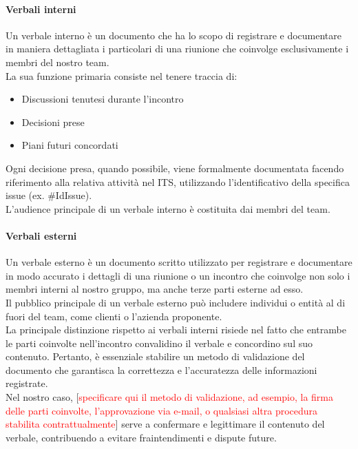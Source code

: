 \documentclass{article}
\begin{document}
\paragraph{Verbali interni}\label{sec:verbali interni}
Un verbale interno è un documento che ha lo scopo di registrare e documentare in maniera dettagliata i particolari di una riunione che coinvolge esclusivamente i membri del nostro team.\\
La sua funzione primaria consiste nel tenere traccia di:
\begin{itemize}
    \item Discussioni tenutesi durante l'incontro
    \item Decisioni prese
    \item Piani futuri concordati 
\end{itemize}
Ogni decisione presa, quando possibile, viene formalmente documentata facendo riferimento alla relativa attività nel ITS, utilizzando l'identificativo della specifica issue (ex. \#IdIssue).\\
L'audience principale di un verbale interno è costituita dai membri del team.

\paragraph{Verbali esterni}\label{sec:verbali esterni}

Un verbale esterno è un documento scritto utilizzato per registrare e documentare in modo accurato i dettagli di una riunione o un incontro che coinvolge non solo i membri interni al nostro gruppo, ma anche terze parti esterne ad esso.\\
Il pubblico principale di un verbale esterno può includere individui o entità al di fuori del team, come clienti o l'azienda proponente.\\
La principale distinzione rispetto ai verbali interni risiede nel fatto che entrambe le parti coinvolte nell'incontro convalidino il verbale e concordino sul suo contenuto. Pertanto, è essenziale stabilire un metodo di validazione del documento che garantisca la correttezza e l'accuratezza delle informazioni registrate.\\
Nel nostro caso, [\textcolor{red}{specificare qui il metodo di validazione, ad esempio, la firma delle parti coinvolte, l'approvazione via e-mail, o qualsiasi altra procedura stabilita contrattualmente}] serve a confermare e legittimare il contenuto del verbale, contribuendo a evitare fraintendimenti e dispute future.
\end{document}
